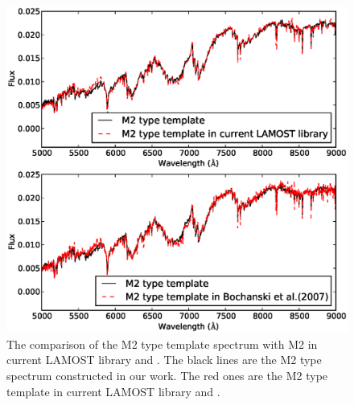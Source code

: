 \documentclass[manuscript]{aastex}
\begin{document}
 \begin{figure}
   \centering
   \includegraphics[width=14cm, angle=0,clip]{f94.eps}
   \caption{The comparison of the M2 type template spectrum with  M2 in   current LAMOST library and \citet{bochanski2007low}.
The black lines are the M2 type spectrum constructed in our work.
The red ones are the M2 type template in   current LAMOST library and \citet{bochanski2007low}.
   }
   \label{Fig94}
\end{figure}

\end{document}
